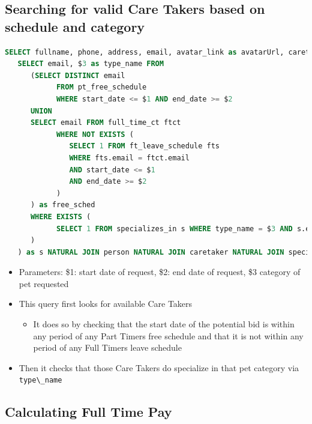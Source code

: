 \documentclass[
  paper=a4,
  ,captions=tableheading
]{scrartcl}
\newcommand{\passthrough}[1]{#1}
\providecommand{\tightlist}{%
  \setlength{\itemsep}{0pt}\setlength{\parskip}{0pt}}
\begin{document}
\hypertarget{searching-for-valid-care-takers-based-on-schedule-and-category}{%
\subsection{Searching for valid Care Takers based on schedule and
category}\label{searching-for-valid-care-takers-based-on-schedule-and-category}}

\begin{lstlisting}[language=SQL]
SELECT fullname, phone, address, email, avatar_link as avatarUrl, caretaker_status as caretakerStatus, rating, ct_price_daily as ctPriceDaily, type_name as typeName FROM (
   SELECT email, $3 as type_name FROM 
      (SELECT DISTINCT email 
            FROM pt_free_schedule 
            WHERE start_date <= $1 AND end_date >= $2
      UNION
      SELECT email FROM full_time_ct ftct
            WHERE NOT EXISTS (
               SELECT 1 FROM ft_leave_schedule fts
               WHERE fts.email = ftct.email
               AND start_date <= $1
               AND end_date >= $2
            )
      ) as free_sched
      WHERE EXISTS (
            SELECT 1 FROM specializes_in s WHERE type_name = $3 AND s.email=free_sched.email
      )
   ) as s NATURAL JOIN person NATURAL JOIN caretaker NATURAL JOIN specializes_in
\end{lstlisting}

\begin{itemize}
\tightlist
\item
  Parameters: \$1: start date of request, \$2: end date of request, \$3
  category of pet requested
\item
  This query first looks for available Care Takers

  \begin{itemize}
  \tightlist
  \item
    It does so by checking that the start date of the potential bid is
    within any period of any Part Timers free schedule and that it is
    not within any period of any Full Timers leave schedule
  \end{itemize}
\item
  Then it checks that those Care Takers do specialize in that pet
  category via \passthrough{\lstinline!type\_name!}
\end{itemize}

\hypertarget{calculating-full-time-pay}{%
\subsection{Calculating Full Time Pay}\label{calculating-full-time-pay}}
\end{document}
